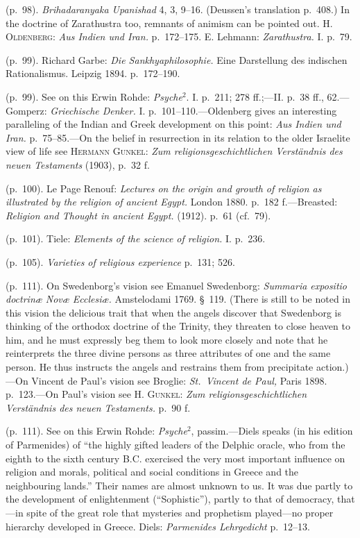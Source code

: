 \documentclass[12pt,a4paper]{book}
\newcommand{\opage}[1]{\marginnote{\footnotesize\textit{[#1]}}}
\begin{document}
 (p.~98). \emph{Brihadaranyaka Upanishad} 4, 3, 9--16. (Deussen's translation p.~408.) In the
doctrine of Zarathustra too, remnants of animism can be pointed out. H. \textsc{Oldenberg}: \emph{Aus
Indien und Iran.} p.~172--175. E. Lehmann: \emph{Zarathustra.} I. p.~79.

 (p.~99). Richard Garbe: \emph{Die Sankhyaphilosophie.} Eine Darstellung des indischen
Rationalismus. Leipzig 1894. p.~172--190.

 (p.~99). See on this Erwin Rohde: \emph{Psyche}$^2$. I. p.~211; 278 ff.;---II. p.~38 ff., 62.---%
Gomperz: \emph{Griechische Denker.} I. p.~101--110.---Oldenberg gives an interesting paralleling of
the Indian and Greek development on this point: \emph{Aus Indien und Iran.} p.~75--85.---On the
\opage{250}belief in resurrection in its relation to the older Israelite view of life see \textsc{Hermann
Gunkel}: \emph{Zum religionsgeschichtlichen Verständnis des neuen Testaments} (1903), p.~32 f.

 (p.~100). Le Page Renouf: \emph{Lectures on the origin and growth of religion as illustrated by the
religion of ancient Egypt.} London 1880. p.~182 f.---Breasted: \emph{Religion and Thought in ancient
Egypt.} (1912). p.~61 (cf.\ 79).

 (p.~101). Tiele: \emph{Elements of the science of religion.} I. p.~236.

 (p.~105). \emph{Varieties of religious experience} p.~131; 526.

 (p.~111). On Swedenborg's vision see Emanuel Swedenborg: \emph{Summaria expositio doctrinæ Novæ
Ecclesiæ.} Amstelodami 1769. §~119. (There is still to be noted in this vision the delicious trait
that when the angels discover that Swedenborg is thinking of the orthodox doctrine of the Trinity,
they threaten to close heaven to him, and he must expressly beg them to look more closely and note
that he reinterprets the three divine persons as three attributes of one and the same person. He
thus instructs the angels and restrains them from precipitate action.)---On Vincent de Paul's vision
see Broglie: \emph{St.\ Vincent de Paul,} Paris 1898. p.~123.---On Paul's vision see H.
\textsc{Gunkel}: \emph{Zum religionsgeschichtlichen Verständnis des neuen Testaments.} p.~90 f.

 (p.~111). See on this Erwin Rohde: \emph{Psyche}$^2$, passim.---Diels speaks (in his edition of
Parmenides) of ``the highly gifted leaders of the Delphic oracle, who from the eighth to the sixth
century B.C. exercised the very most important influence on religion and morals, political and social
conditions in Greece and the neighbouring lands.'' Their names are almost unknown to us. It was due
partly to the development of enlightenment (``Sophistic''), partly to that of democracy, that---in
spite of the great role that mysteries and prophetism played---no proper hierarchy developed in
Greece. Diels: \emph{Parmenides Lehrgedicht} p.~12--13.
\end{document}
